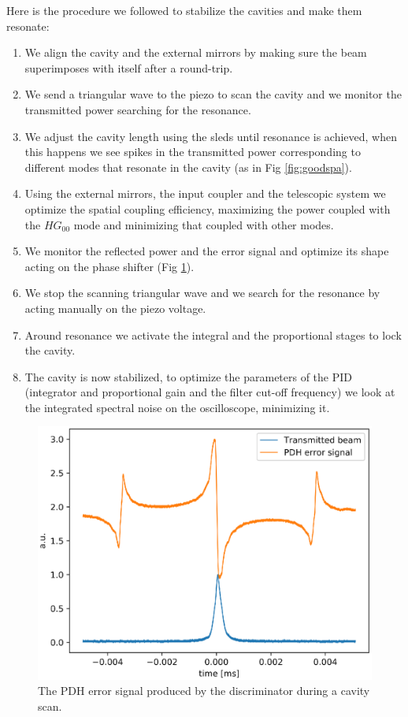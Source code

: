 Here is the procedure we followed to stabilize the cavities and make them resonate:
\begin{enumerate}
	\item We align the cavity and the external mirrors by making sure the beam superimposes with itself after a round-trip.
	\item We send a triangular wave to the piezo to scan the cavity and we monitor the transmitted power searching for the resonance.
	\item We adjust the cavity length using the sleds until resonance is achieved, when this happens we see spikes in the transmitted power corresponding to different modes that resonate in the cavity (as in Fig \ref{fig:goodspa}).
	\item Using the external mirrors, the input coupler and the telescopic system we optimize the spatial coupling efficiency, maximizing the power coupled with the $HG_{00}$ mode and minimizing that coupled with other modes.
	\item We monitor the reflected power and the error signal and optimize its shape acting on the phase shifter (Fig \ref{fig:pdhtra}).
	\item We stop the scanning triangular wave and we search for the resonance by acting manually on the piezo voltage.
	\item Around resonance we activate the integral and the proportional stages to lock the cavity.
	\item The cavity is now stabilized, to optimize the parameters of the PID (integrator and proportional gain and the filter cut-off frequency) we look at the integrated spectral noise on the oscilloscope, minimizing it.
\end{enumerate}
\begin{figure}
	\centering
	\includegraphics[width=1\linewidth]{images/pdhtra.eps}
	\caption{The PDH error signal produced by the discriminator during a cavity scan.}
	\label{fig:pdhtra}
\end{figure}
